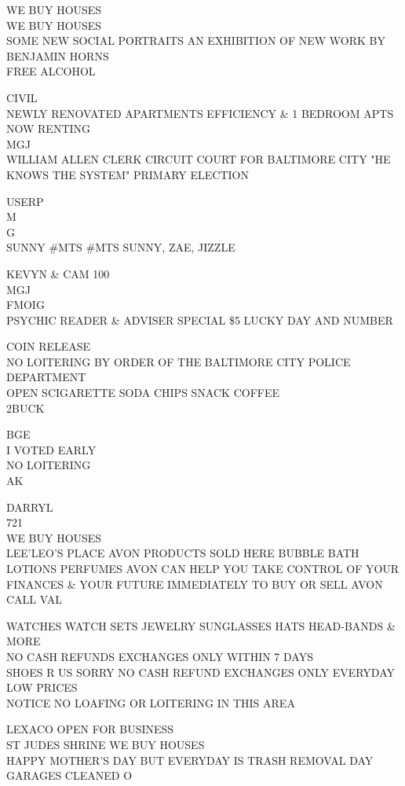 \documentclass[10pt,letterpaper]{article}
\begin{document}
WE BUY HOUSES\\
WE BUY HOUSES\\
SOME NEW SOCIAL PORTRAITS AN EXHIBITION OF NEW WORK BY BENJAMIN HORNS\\
FREE ALCOHOL

CIVIL\\
NEWLY RENOVATED APARTMENTS EFFICIENCY \& 1 BEDROOM APTS NOW RENTING\\
MGJ\\
WILLIAM ALLEN CLERK CIRCUIT COURT FOR BALTIMORE CITY "HE KNOWS THE SYSTEM" PRIMARY ELECTION

USERP\\
M\\
G\\
SUNNY \#MTS \#MTS SUNNY, ZAE, JIZZLE

KEVYN \& CAM 100\\
MGJ\\
FMOIG\\
PSYCHIC READER \& ADVISER SPECIAL \$5 LUCKY DAY AND NUMBER

COIN RELEASE\\
NO LOITERING BY ORDER OF THE BALTIMORE CITY POLICE DEPARTMENT\\
OPEN SCIGARETTE SODA CHIPS SNACK COFFEE\\
2BUCK

BGE\\
I VOTED EARLY\\
NO LOITERING\\
AK

DARRYL\\
721\\
WE BUY HOUSES\\
LEE'LEO'S PLACE AVON PRODUCTS SOLD HERE BUBBLE BATH LOTIONS PERFUMES AVON CAN HELP YOU TAKE CONTROL OF YOUR FINANCES \& YOUR FUTURE IMMEDIATELY TO BUY OR SELL AVON CALL VAL

WATCHES WATCH SETS JEWELRY SUNGLASSES HATS HEAD{-}BANDS \& MORE\\
NO CASH REFUNDS EXCHANGES ONLY WITHIN 7 DAYS\\
SHOES R US SORRY NO CASH REFUND EXCHANGES ONLY EVERYDAY LOW PRICES\\
NOTICE NO LOAFING OR LOITERING IN THIS AREA

LEXACO OPEN FOR BUSINESS\\
ST JUDES SHRINE WE BUY HOUSES\\
HAPPY MOTHER'S DAY BUT EVERYDAY IS TRASH REMOVAL DAY\\
GARAGES CLEANED O
\end{document}
